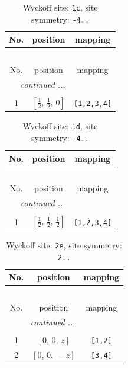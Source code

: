 \documentclass[fleqn,8pt]{jsarticle}
\begin{document}
\begin{longtable}{ccc}
\caption{Wyckoff site: {\tt 1c}, site symmetry: {\tt -4..}}
 \\
 \hline \hline
No. & position & mapping \\ \hline \endfirsthead

\multicolumn{2}{l}{\tablename\ \thetable{}} \\
 \hline \hline
No. & position & mapping \\ \hline \endhead

 \hline \hline
\multicolumn{2}{r}{\footnotesize\it continued ...} \\ \endfoot

 \hline \hline
\multicolumn{2}{r}{} \\ \endlastfoot

1 & $\left[ \frac{1}{2},\, \frac{1}{2},\, 0 \right]$ & {\tt [1,2,3,4]} \\
\end{longtable}
\renewcommand{\arraystretch}{1.2}
\begin{longtable}{ccc}
\caption{Wyckoff site: {\tt 1d}, site symmetry: {\tt -4..}}
 \\
 \hline \hline
No. & position & mapping \\ \hline \endfirsthead

\multicolumn{2}{l}{\tablename\ \thetable{}} \\
 \hline \hline
No. & position & mapping \\ \hline \endhead

 \hline \hline
\multicolumn{2}{r}{\footnotesize\it continued ...} \\ \endfoot

 \hline \hline
\multicolumn{2}{r}{} \\ \endlastfoot

1 & $\left[ \frac{1}{2},\, \frac{1}{2},\, \frac{1}{2} \right]$ & {\tt [1,2,3,4]} \\
\end{longtable}
\renewcommand{\arraystretch}{1.2}
\begin{longtable}{ccc}
\caption{Wyckoff site: {\tt 2e}, site symmetry: {\tt 2..}}
 \\
 \hline \hline
No. & position & mapping \\ \hline \endfirsthead

\multicolumn{2}{l}{\tablename\ \thetable{}} \\
 \hline \hline
No. & position & mapping \\ \hline \endhead

 \hline \hline
\multicolumn{2}{r}{\footnotesize\it continued ...} \\ \endfoot

 \hline \hline
\multicolumn{2}{r}{} \\ \endlastfoot

1 & $\left[ 0,\, 0,\, z \right]$ & {\tt [1,2]} \\ \hline
2 & $\left[ 0,\, 0,\, - z \right]$ & {\tt [3,4]} \\
\end{longtable}
\end{document}
